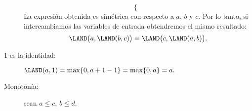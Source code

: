 \begin{description}
\begin{equation*}
\begin{cases}
         \end{cases}
    \end{equation*}
    La expresión obtenida es simétrica
    con respecto a \(a\), \(b\) y \(c\).
    Por lo tanto,
    si intercambiamos las variables de entrada
    obtendremos el mismo resultado:
    \begin{equation*}
      \LAND\bigl(a, \LAND(b, c)\bigr) =
      \LAND\bigl(c, \LAND(a, b)\bigr).
    \end{equation*}
  \item[1 es la identidad:]
    \(
      \LAND(a, 1) = \max\{0, a + 1 - 1\} = \max\{0, a\} = a.
    \)
  \item[Monotonía:] sean \(a ≤ c\), \(b ≤ d\).

\end{description}

